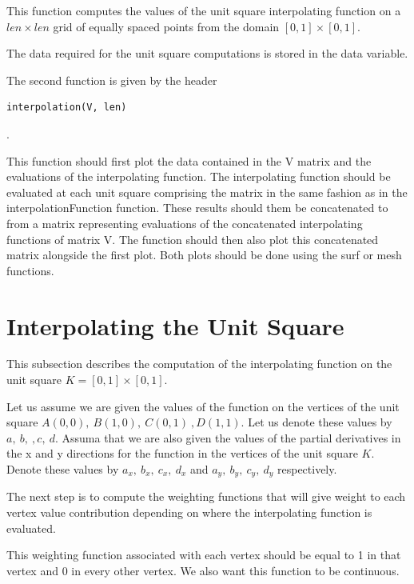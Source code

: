 \documentclass[fleqn]{article}
\begin{document}
This function computes the values of the unit square interpolating function on a $len \times len$ grid of equally spaced points from the domain $[0,1] \times [0,1]$.

The data required for the unit square computations is stored in the data variable.

The second function is given by the header

\begin{tcolorbox}
\begin{verbatim}
interpolation(V, len)
\end{verbatim}.
\end{tcolorbox}

This function should first plot the data contained in the V matrix and the evaluations of the interpolating function. The interpolating function should be evaluated at each unit square comprising the matrix in the same fashion as in the interpolationFunction function. These results should them be concatenated to from a matrix representing evaluations of the concatenated interpolating functions of matrix V. The function should then also plot this concatenated matrix alongside the first plot. Both plots should be done using the surf or mesh functions.

\section{Interpolating the Unit Square}

This subsection describes the computation of the interpolating function on the unit square $K = [0, 1] \times [0, 1]$.

Let us assume we are given the values of the function on the vertices of the unit square $A(0,0), \ B(1, 0), \ C(0, 1) \ , D(1, 1)$. Let us denote these values by $a, \ b, \ ,c, \ d$. Assuma that we are also given the values of the partial derivatives in the x and y directions for the function in the vertices of the unit square $K$. Denote these values by $a_{x}, \ b_{x}, \ c_{x}, \ d_{x}$ and $a_{y}, \ b_{y}, \ c_{y}, \ d_{y}$ respectively.

The next step is to compute the weighting functions that will give weight to each vertex value contribution depending on where the interpolating function is evaluated.

This weighting function associated with each vertex should be equal to 1 in that vertex and 0 in every other vertex. We also want this function to be continuous.
\end{document}
